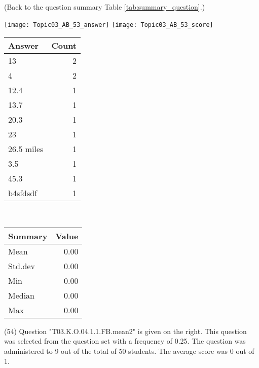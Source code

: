 \documentclass[12pt,english,nohyper]{tufte-handout}\usepackage[]{graphicx}\usepackage[]{color}
\begin{document}
 (Back to the question summary Table \ref{tab:summary_question}.)

\begin{center} \texttt{[image: Topic03\_AB\_53\_answer]} \texttt{[image: Topic03\_AB\_53\_score]} \end{center} 

\begin{center}%
\begin{tabular}{lr}
  \hline
Answer & Count \\ 
  \hline
13 &   2 \\ 
  4 &   2 \\ 
  12.4 &   1 \\ 
  13.7 &   1 \\ 
  20.3 &   1 \\ 
  23 &   1 \\ 
  26.5 miles &   1 \\ 
  3.5 &   1 \\ 
  45.3 &   1 \\ 
  b4sfdsdf &   1 \\ 
   \hline
\end{tabular}
~~~~~~~~%
\begin{tabular}{lr}
  \hline
Summary & Value \\ 
  \hline
Mean & 0.00 \\ 
  Std.dev & 0.00 \\ 
  Min & 0.00 \\ 
  Median & 0.00 \\ 
  Max & 0.00 \\ 
   \hline
\end{tabular}
\end{center}\newpage{} (54) Question "T03.K.O.04.1.1.FB.mean2" is given on the right. This question was selected from the question set with a frequency of 0.25. The question was administered to 9 out of the total of 50 students. The average score was 0 out of 1.
\end{document}
